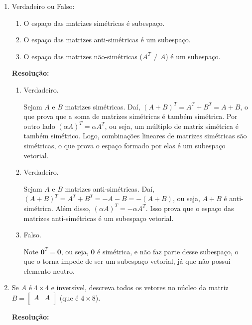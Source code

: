\documentclass[leqno]{article}
\begin{document}
\begin{enumerate}
    \item Verdadeiro ou Falso:
    
    \begin{enumerate}
        \item O espaço das matrizes simétricas é subespaço.
        \item O espaço das matrizes anti-simétricas é um subespaço.
        \item O espaço das matrizes não-simétricas ($A^T\neq A$) é um subespaço.
    \end{enumerate}
    
    \textbf{Resolução:}
    
    \begin{enumerate}
        \item Verdadeiro.
        
        Sejam $A$ e $B$ matrizes simétricas. Daí, $(A+B)^T=A^T+B^T=A+B$, o que prova que a soma de matrizes simétricas é também simétrica. Por outro lado $(\alpha A)^T=\alpha A^T$, ou seja, um múltiplo de matriz simétrica é também simétrico. Logo, combinações lineares de matrizes simétricas são simétricas, o que prova o espaço formado por elas é um subespaço vetorial.
        
        \item Verdadeiro.
        
        Sejam $A$ e $B$ matrizes anti-simétricas. Daí, $(A+B)^T=A^T+B^T=-A-B=-(A+B)$, ou seja, $A+B$ é anti-simétrica. Além disso, $(\alpha A)^T=-\alpha A^T$. Isso prova que o espaço das matrizes anti-simétricas é um subespaço vetorial.
        
        \item Falso.
        
        Note $\textbf{0}^T = \textbf{0}$, ou seja, $\textbf{0}$ é simétrica, e não faz parte desse subespaço, o que o torna impede de ser um subespaço vetorial, já que não possui elemento neutro.
    \end{enumerate}
    
    \item Se $A$ é $4\times 4$ e inversível, descreva todos os vetores no núcleo da matriz $B=\begin{bmatrix}
    A & A\\
    \end{bmatrix}$ (que é $4\times 8$).
    
    \textbf{Resolução:}
    

\end{enumerate}
\end{document}
